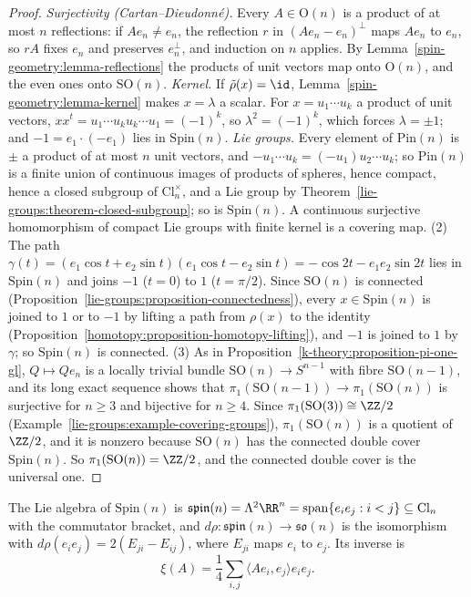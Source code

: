 \begin{proof}
\emph{Surjectivity (Cartan--Dieudonn\'e).} Every $A \in \mathrm{O}(n)$ is a product of at most $n$ reflections: if $Ae_n \neq e_n$, the reflection $r$ in $(Ae_n - e_n)^\perp$ maps $Ae_n$ to $e_n$, so $rA$ fixes $e_n$ and
preserves $e_n^\perp$, and induction on $n$ applies. By Lemma~\ref{spin-geometry:lemma-reflections} the products of unit vectors map onto $\mathrm{O}(n)$, and the even ones onto $\mathrm{SO}(n)$.
\emph{Kernel.} If $\tilde{\rho}(x) = \id$, Lemma~\ref{spin-geometry:lemma-kernel} makes $x = \lambda$ a scalar. For $x = u_1\cdots u_k$ a product of unit vectors, $xx^t = u_1\cdots u_ku_k\cdots u_1 = (-1)^k$, so $\lambda^2 = (-1)^k$,
which forces $\lambda = \pm 1$; and $-1 = e_1 \cdot (-e_1)$ lies in $\mathrm{Spin}(n)$.
\emph{Lie groups.} Every element of $\mathrm{Pin}(n)$ is $\pm$ a product of at most $n$ unit vectors, and $-u_1 \cdots u_k = (-u_1)u_2\cdots u_k$; so $\mathrm{Pin}(n)$ is a finite union of continuous images of products of spheres,
hence compact, hence a closed subgroup of $\mathrm{Cl}_n^\times$, and a Lie group by Theorem~\ref{lie-groups:theorem-closed-subgroup}; so is $\mathrm{Spin}(n)$. A continuous surjective homomorphism of compact Lie groups
with finite kernel is a covering map.
(2) The path $\gamma(t) = (e_1\cos t + e_2\sin t)(e_1\cos t - e_2\sin t) = -\cos 2t - e_1e_2\sin 2t$ lies in $\mathrm{Spin}(n)$ and joins $-1$ ($t = 0$) to $1$ ($t = \pi/2$). Since $\mathrm{SO}(n)$ is connected
(Proposition~\ref{lie-groups:proposition-connectedness}), every $x \in \mathrm{Spin}(n)$ is joined to $1$ or to $-1$ by lifting a path from $\rho(x)$ to the identity (Proposition~\ref{homotopy:proposition-homotopy-lifting}), and
$-1$ is joined to $1$ by $\gamma$; so $\mathrm{Spin}(n)$ is connected.
(3) As in Proposition~\ref{k-theory:proposition-pi-one-gl}, $Q \mapsto Qe_n$ is a locally trivial bundle $\mathrm{SO}(n) \to S^{n-1}$ with fibre $\mathrm{SO}(n-1)$, and its long exact sequence shows that
$\pi_1(\mathrm{SO}(n-1)) \to \pi_1(\mathrm{SO}(n))$ is surjective for $n \geq 3$ and bijective for $n \geq 4$. Since $\pi_1(\mathrm{SO}(3)) \cong \ZZ/2$ (Example~\ref{lie-groups:example-covering-groups}), $\pi_1(\mathrm{SO}(n))$ is
a quotient of $\ZZ/2$, and it is nonzero because $\mathrm{SO}(n)$ has the connected double cover $\mathrm{Spin}(n)$. So $\pi_1(\mathrm{SO}(n)) = \ZZ/2$, and the connected double cover is the universal one.
\end{proof}

\begin{proposition}\label{spin-geometry:proposition-spin-lie-algebra}
The Lie algebra of $\mathrm{Spin}(n)$ is $\mathfrak{spin}(n) = \Lambda^2\RR^n = \operatorname{span}\{e_ie_j : i < j\} \subseteq \mathrm{Cl}_n$ with the commutator bracket, and $d\rho \colon \mathfrak{spin}(n) \to \mathfrak{so}(n)$ is the
isomorphism with $d\rho(e_ie_j) = 2(E_{ji} - E_{ij})$, where $E_{ji}$ maps $e_i$ to $e_j$. Its inverse is
\begin{equation}\label{spin-geometry:equation-xi}
\xi(A) = \frac14\sum_{i,j}\langle Ae_i, e_j\rangle e_ie_j.
\end{equation}
\end{proposition}

